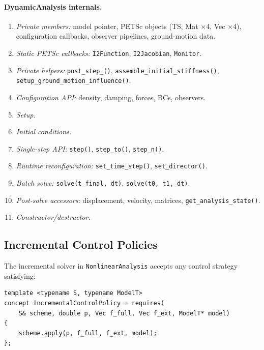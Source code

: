 \paragraph{DynamicAnalysis internals.}
\begin{enumerate}[nosep]
  \item \emph{Private members:} model pointer, PETSc objects (TS, Mat $\times$4, Vec $\times$4),
        configuration callbacks, observer pipelines, ground-motion data.
  \item \emph{Static PETSc callbacks:} \texttt{I2Function}, \texttt{I2Jacobian},
        \texttt{Monitor}.
  \item \emph{Private helpers:} \texttt{post\_step\_()},
        \texttt{assemble\_initial\_stiffness()},
        \texttt{setup\_ground\_motion\_influence()}.
  \item \emph{Configuration API:} density, damping, forces, BCs, observers.
  \item \emph{Setup.}
  \item \emph{Initial conditions.}
  \item \emph{Single-step API:} \texttt{step()}, \texttt{step\_to()}, \texttt{step\_n()}.
  \item \emph{Runtime reconfiguration:} \texttt{set\_time\_step()}, \texttt{set\_director()}.
  \item \emph{Batch solve:} \texttt{solve(t\_final, dt)}, \texttt{solve(t0, t1, dt)}.
  \item \emph{Post-solve accessors:} displacement, velocity, matrices, \texttt{get\_analysis\_state()}.
  \item \emph{Constructor/destructor.}
\end{enumerate}


\subsection{Incremental Control Policies}
\label{sec:arch:analysis:control}

The incremental solver in \texttt{NonlinearAnalysis} accepts any control
strategy satisfying:

\begin{verbatim}
template <typename S, typename ModelT>
concept IncrementalControlPolicy = requires(
    S& scheme, double p, Vec f_full, Vec f_ext, ModelT* model)
{
    scheme.apply(p, f_full, f_ext, model);
};
\end{verbatim}

